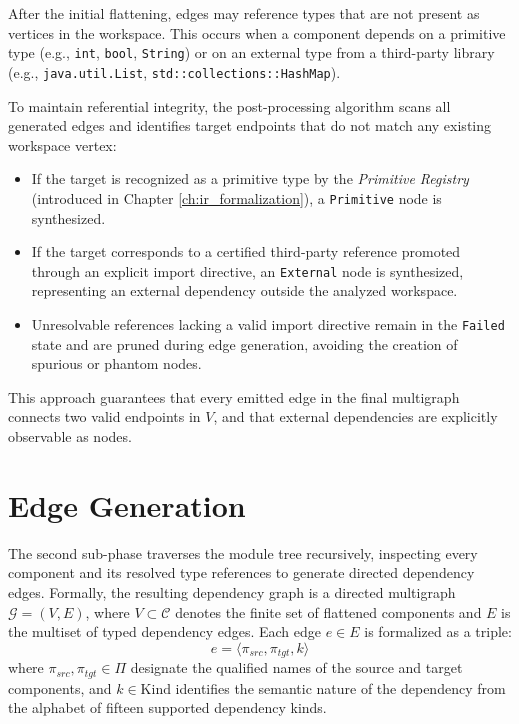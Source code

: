 After the initial flattening, edges may reference types that are not
present as vertices in the workspace. This occurs when a component
depends on a primitive type (e.g., \texttt{int}, \texttt{bool},
\texttt{String}) or on an external type from a third-party library
(e.g., \texttt{java.util.List}, \texttt{std::collections::HashMap}).

To maintain referential integrity, the post-processing algorithm scans all
generated edges and identifies target endpoints that do not match any
existing workspace vertex:
\begin{itemize}
  \item If the target is recognized as a primitive type by the
    \textit{Primitive Registry} (introduced in Chapter
    \ref{ch:ir_formalization}), a \texttt{Primitive} node is synthesized.
  \item If the target corresponds to a certified third-party reference
    promoted through an explicit import directive, an \texttt{External}
    node is synthesized, representing an external dependency outside the
    analyzed workspace.
  \item Unresolvable references lacking a valid import directive remain in
    the \texttt{Failed} state and are pruned during edge generation, avoiding
    the creation of spurious or phantom nodes.
\end{itemize}

This approach guarantees that every emitted edge in the final multigraph
connects two valid endpoints in $V$, and that external dependencies are
explicitly observable as nodes.

\section{Edge Generation}
\label{sec:edge_generation}

The second sub-phase traverses the module tree recursively, inspecting every
component and its resolved type references to generate directed dependency
edges. Formally, the resulting dependency graph is a directed multigraph
$\mathcal{G} = (V, E)$, where $V \subset \mathcal{C}$ denotes the finite set of
flattened components and $E$ is the multiset of typed dependency edges.
Each edge $e \in E$ is formalized as a triple:
$$e = \langle \pi_{src}, \pi_{tgt}, k \rangle$$
where $\pi_{src}, \pi_{tgt} \in \Pi$ designate the qualified names of the
source and target components, and $k \in \text{Kind}$ identifies the semantic
nature of the dependency from the alphabet of fifteen supported
dependency kinds.


